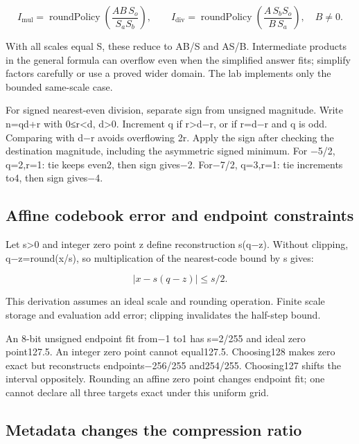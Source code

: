 \[
I_{\mathrm{mul}}=\operatorname{roundPolicy}
  \left(\frac{AB\,S_o}{S_aS_b}\right),
\qquad
I_{\mathrm{div}}=\operatorname{roundPolicy}
  \left(\frac{A\,S_bS_o}{B\,S_a}\right),\quad B\ne0.
\]

With all scales equal S, these reduce to AB/S and AS/B. Intermediate products in the general formula can overflow even when the simplified answer fits; simplify factors carefully or use a proved wider domain. The lab implements only the bounded same-scale case.

For signed nearest-even division, separate sign from unsigned magnitude. Write n=qd+r with 0≤r\textless d, d\textgreater0. Increment q if r\textgreater d−r, or if r=d−r and q is odd. Comparing with d−r avoids overflowing 2r. Apply the sign after checking the destination magnitude, including the asymmetric signed minimum. For −5/2, q=2,r=1: tie keeps even2, then sign gives−2. For−7/2, q=3,r=1: tie increments to4, then sign gives−4.

\subsection{Affine codebook error and endpoint constraints}\label{03-visual-computing-i-ch018-affine-codebook-error-and-endpoint-constraints}

\hypertarget{03-visual-computing-i-ch018-affine-codebook-error-and-endpoint-constraints}{}

Let s\textgreater0 and integer zero point z define reconstruction s(q−z). Without clipping, q−z=round(x/s), so multiplication of the nearest-code bound by s gives:

\[
\left|x-s(q-z)\right|\le s/2.
\]

This derivation assumes an ideal scale and rounding operation. Finite scale storage and evaluation add error; clipping invalidates the half-step bound.

An 8-bit unsigned endpoint fit from−1 to1 has s=2/255 and ideal zero point127.5. An integer zero point cannot equal127.5. Choosing128 makes zero exact but reconstructs endpoints−256/255 and254/255. Choosing127 shifts the interval oppositely. Rounding an affine zero point changes endpoint fit; one cannot declare all three targets exact under this uniform grid.

\subsection{Metadata changes the compression ratio}\label{03-visual-computing-i-ch018-metadata-changes-the-compression-ratio}

